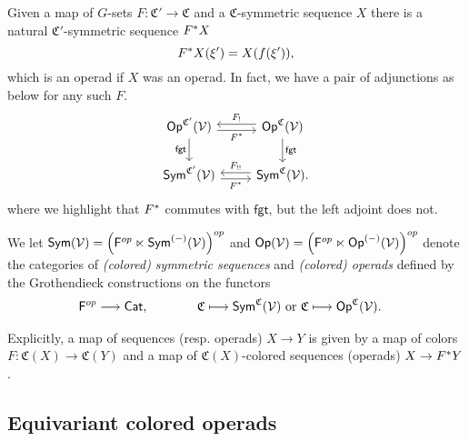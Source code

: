 \documentclass[a4paper,10pt
,draft
]{article}%
\renewcommand{\1}{\eta}%
\begin{document}
\begin{definition}
      \label{OP_MAP_DEFN}
      Given a map of $G$-sets $F: \mathfrak C' \to \mathfrak C$ and a $\mathfrak C$-symmetric sequence $X$
      there is a natural $\mathfrak C'$-symmetric sequence $F^{\**}X$
      \begin{equation}
            F^{\**}X(\xi') = X(f(\xi')),
      \end{equation}
      which is an operad if $X$ was an operad.
      In fact, we have a pair of adjunctions as below for any such $F$.
      \begin{equation}
            \label{C_CHANGE_EQ}
            \begin{tikzcd}
                  \Op^{\mathfrak C'}(\V) \arrow[r, shift right, "F^{\**}"'] \arrow[d, "\mathsf{fgt}"']
                  &
                  \Op^{\mathfrak C}(\V) \arrow[l, shift right, "F_!"'] \arrow[d, "\mathsf{fgt}"]
                  \\
                  \Sym^{\mathfrak C'}(\V) \arrow[r, shift right, "F^{\**}"']
                  &
                  \Sym^{\mathfrak C}(\V) \arrow[l, shift right, "F_{!!}"'].
            \end{tikzcd}
      \end{equation}
      where we highlight that $F^{\**}$ commutes with $\mathsf{fgt}$, but the left adjoint does not.

      We let $\mathsf{Sym}(\mathcal V) = \left(\mathsf F^{op} \ltimes \mathsf{Sym}^{(-)}(\mathcal V)\right)^{op}$ and $\mathsf{Op}(\mathcal V) = \left(\mathsf F^{op} \ltimes \mathsf{Op}^{(-)}(\mathcal V)\right)^{op}$
      denote the categories of
      \textit{(colored) symmetric sequences} and \textit{(colored) operads}
      defined by the Grothendieck constructions on the functors
      \begin{align*}
        \mathsf F^{op} \longrightarrow \mathsf{Cat},
        \qquad \qquad
        &
          \mathfrak C \longmapsto \mathsf{Sym}^{\mathfrak C}(\mathcal V)
          \mbox{ or }
          \mathfrak C \longmapsto \mathsf{Op}^{\mathfrak C}(\mathcal V).
      \end{align*}
      
      Explicitly, a map of sequences (resp. operads) $X \to Y$ is given by a map of colors
      $F: \mathfrak C(X) \to \mathfrak C(Y)$
      and a map of $\mathfrak C(X)$-colored sequences (operads)
      $X \to F^{\**} Y$.
\end{definition}

\subsection{Equivariant colored operads}
\end{document}
